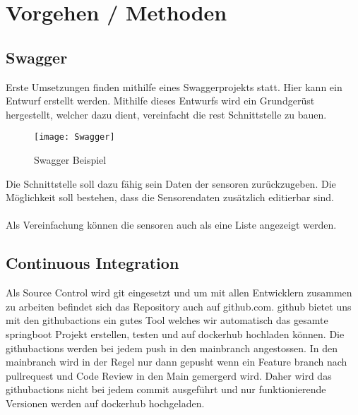 \documentclass[../main.tex]{subfiles}
\begin{document}
	\section{Vorgehen / Methoden}
	
	\subsection{Swagger}
	Erste Umsetzungen finden mithilfe eines Swaggerprojekts statt. Hier kann ein Entwurf erstellt werden. Mithilfe dieses Entwurfs wird ein Grundgerüst hergestellt, welcher dazu dient, vereinfacht die \gls{rest} Schnittstelle zu bauen.
	
	\begin{figure}[H]
		\centering
		\texttt{[image: Swagger]}
		\caption{Swagger Beispiel}
		\label{fig:Swagger}
	\end{figure}
	\par
	\noindent
	Die Schnittstelle soll dazu fähig sein Daten der \gls{sensor}en zurückzugeben. Die Möglichkeit soll bestehen, dass die Sensorendaten zusätzlich editierbar sind.\\
	\\
	Als Vereinfachung können die \gls{sensor}en auch als eine Liste angezeigt werden.
	
	\subsection{Continuous Integration}
	Als Source Control wird \gls{git} eingesetzt und um mit allen Entwicklern zusammen zu arbeiten befindet sich das Repository auch auf github.com. \gls{github} bietet uns mit den \gls{githubactions} ein gutes Tool welches wir automatisch das gesamte \gls{springboot} Projekt erstellen, testen und auf \gls{dockerhub} hochladen können. Die \gls{githubactions} werden bei jedem \gls{push} in den \gls{mainbranch} angestossen. In den \gls{mainbranch} wird in der Regel nur dann gepusht wenn ein Feature \gls{branch} nach \gls{pullrequest} und Code Review in den Main gemergerd wird. Daher wird das \gls{githubactions} nicht bei jedem \gls{commit} ausgeführt und nur funktionierende Versionen werden auf \gls{dockerhub} hochgeladen.
	
\end{document}
